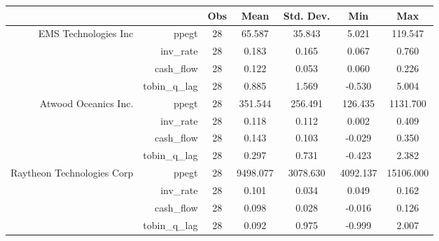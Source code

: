 \begin{tabular}{rr|ccccc}
\toprule
                                            &               & Obs & Mean     & Std. Dev. & Min      & Max       \\ \hline
      \multirow{4}{*}{EMS Technologies Inc} &         ppegt &  28 &   65.587 &    35.843 &    5.021 &   119.547 \\
                                            &     inv\_rate &  28 &    0.183 &     0.165 &    0.067 &     0.760 \\
                                            &    cash\_flow &  28 &    0.122 &     0.053 &    0.060 &     0.226 \\
                                            & tobin\_q\_lag &  28 &    0.885 &     1.569 &   -0.530 &     5.004 \\ \hline
      \multirow{4}{*}{Atwood Oceanics Inc.} &         ppegt &  28 &  351.544 &   256.491 &  126.435 &  1131.700 \\
                                            &     inv\_rate &  28 &    0.118 &     0.112 &    0.002 &     0.409 \\
                                            &    cash\_flow &  28 &    0.143 &     0.103 &   -0.029 &     0.350 \\
                                            & tobin\_q\_lag &  28 &    0.297 &     0.731 &   -0.423 &     2.382 \\ \hline
\multirow{4}{*}{Raytheon Technologies Corp} &         ppegt &  28 & 9498.077 &  3078.630 & 4092.137 & 15106.000 \\
                                            &     inv\_rate &  28 &    0.101 &     0.034 &    0.049 &     0.162 \\
                                            &    cash\_flow &  28 &    0.098 &     0.028 &   -0.016 &     0.126 \\
                                            & tobin\_q\_lag &  28 &    0.092 &     0.975 &   -0.999 &     2.007 \\
\bottomrule
\end{tabular}